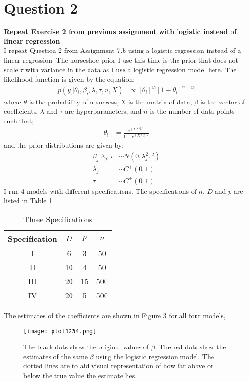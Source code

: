 \documentclass{article}
\begin{document}
\section{Question 2}
\textbf{Repeat Exercise 2 from previous assignment with logistic instead of linear regression}\\
I repeat Question 2 from Assignment 7.b using a logistic regression instead of a linear regression. The horseshoe prior I use this time is the prior that does not scale $\tau$ with variance in the data as I use a logistic regression model here.
The likelihood function is given by the equation;
\begin{align}
p(y_i|\theta_i, \beta_i, \lambda,\tau,n,X) &\propto [\theta_i]^{y_i} [1 - \theta_i]^{n- y_i}
\end{align}
where $\theta$ is the probability of a success, X is the matrix of data, $\beta$ is the vector of coefficients, $\lambda$ and $\tau$ are hyperparameters, and $n$ is the number of data points such that;
\begin{align}
\theta_i &= \frac{e^{(X*\beta_i)}}{1 + e^{(X*\beta_i)}}
\end{align}
and the prior distributions are given by;
\begin{align}
\beta_j|\lambda_j , \tau & \sim N(0, \lambda_j^2\tau^2) \\
\lambda_j & \sim C^{+}(0, 1) \\
\tau & \sim C^{+}(0, 1)
\end{align}
I run 4 models with different specifications. The specifications of $n$, $D$ and $p$ are listed in Table 1.
\begin{table}[H]
\caption {Three Specifications}
\vspace{2mm}
\def\arraystretch{1.5}
\centering \begin{tabular}{c c c c} 
\hline\hline 
\vspace{1mm}
Specification & $D$ &  $p$ & $n$ \\ [0.5ex] 
\hline 
I & 6 & 3 & 50 \\
II &10 & 4 & 50 \\ 
III & 20 & 15 & 500\\
IV & 20 & 5 & 500\\
\hline 
\end{tabular}
\end{table}
The estimates of the coefficients are shown in Figure 3 for all four models,
 \begin{figure}[H]
\centering
\texttt{[image: plot1234.png]}
\caption{The black dots show the original values of $\beta$. The red dots show the estimates of the same $\beta$ using the logistic regression model. The dotted lines are to aid visual representation of how far above or below the true value the estimate lies.}
\label{deltat}
\end{figure}
\end{document}
